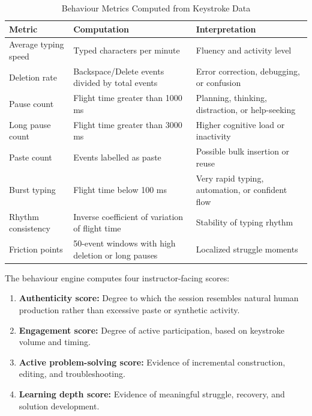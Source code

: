 \begin{table}[H]
  \centering
  \caption{Behaviour Metrics Computed from Keystroke Data}
  \label{tab:behaviour-metrics}
  \begin{singlespace}
  \begin{tabularx}{\textwidth}{@{}p{3.3cm}p{4.0cm}p{5.2cm}@{}}
    \toprule
    \textbf{Metric} & \textbf{Computation} & \textbf{Interpretation} \\
    \midrule
    Average typing speed & Typed characters per minute & Fluency and activity level \\
    Deletion rate & Backspace/Delete events divided by total events & Error correction, debugging, or confusion \\
    Pause count & Flight time greater than 1000 ms & Planning, thinking, distraction, or help-seeking \\
    Long pause count & Flight time greater than 3000 ms & Higher cognitive load or inactivity \\
    Paste count & Events labelled as paste & Possible bulk insertion or reuse \\
    Burst typing & Flight time below 100 ms & Very rapid typing, automation, or confident flow \\
    Rhythm consistency & Inverse coefficient of variation of flight time & Stability of typing rhythm \\
    Friction points & 50-event windows with high deletion or long pauses & Localized struggle moments \\
    \bottomrule
  \end{tabularx}
  \end{singlespace}
\end{table}

The behaviour engine computes four instructor-facing scores:

\begin{enumerate}
  \item \textbf{Authenticity score:} Degree to which the session resembles natural human production rather than excessive paste or synthetic activity.
  \item \textbf{Engagement score:} Degree of active participation, based on keystroke volume and timing.
  \item \textbf{Active problem-solving score:} Evidence of incremental construction, editing, and troubleshooting.
  \item \textbf{Learning depth score:} Evidence of meaningful struggle, recovery, and solution development.
\end{enumerate}

